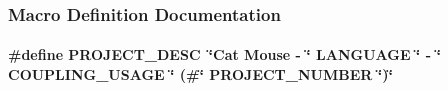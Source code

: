 \subsubsection{Macro Definition Documentation}
\paragraph[{P\-R\-O\-J\-E\-C\-T\-\_\-\-D\-E\-S\-C}]{\setlength{\rightskip}{0pt plus 5cm}\#define P\-R\-O\-J\-E\-C\-T\-\_\-\-D\-E\-S\-C~\char`\"{}Cat {\bf Mouse} -\/ \char`\"{} L\-A\-N\-G\-U\-A\-G\-E \char`\"{} -\/ \char`\"{} {\bf C\-O\-U\-P\-L\-I\-N\-G\-\_\-\-U\-S\-A\-G\-E} \char`\"{} (\#\char`\"{} {\bf P\-R\-O\-J\-E\-C\-T\-\_\-\-N\-U\-M\-B\-E\-R} \char`\"{})\char`\"{}}\label{_g_u_i_8cpp_a8db0aeef13d014255255148788ed7276}
